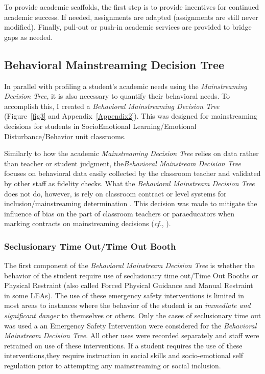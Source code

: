 \documentclass[twoside]{article}
\begin{document}
To provide academic scaffolds, the first step is to provide incentives for continued academic success. If needed, assignments are adapted (assignments are still never modified). Finally, pull-out or push-in academic services are provided to bridge gaps as needed.
%
%
\subsection{Behavioral Mainstreaming Decision Tree}
In parallel with profiling a student's academic needs using the \textit{Mainstreaming Decision Tree}, it is also necessary to quantify their behavioral needs. To accomplish this, I created a \textit{Behavioral Mainstreaming Decision Tree} (Figure~\ref{fig3} and Appendix~\ref{Appendix2}). This was designed for mainstreaming decisions for students in SocioEmotional Learning/Emotional Disturbance/Behavior unit classrooms. 

Similarly to how the academic \textit{Mainstreaming Decision Tree} relies on data rather than teacher or student judgment, the\textit{Behavioral Mainstream Decision Tree} focuses on behavioral data easily collected by the classroom teacher and validated by other staff as fidelity checks. What the \textit{Behavioral Mainstream Decision Tree} does not do, however, is rely on classroom contract or level systems for inclusion/mainstreaming determination \parencite{Smith1993,iwata1974reward}. This decision was made to mitigate the influence of bias on the part of classroom teachers or paraeducators when marking contracts on mainstreaming decisions (\textit{cf.}, \cite{peacock1991problems,PITS:PITS8}). 

\subsubsection{Seclusionary Time Out/Time Out Booth}
The first component of the \textit{Behavioral Mainstream Decision Tree} is whether the behavior of the student require use of seclusionary time out/Time Out Booths or Physical Restraint (also called Forced Physical Guidance and Manual Restraint in some LEAs). The use of these emergency safety interventions is limited in most areas to instances where the behavior of the student is an \textit{immediate and significant danger} to themselves or others. Only the cases of seclusionary time out was used a an Emergency Safety Intervention were considered for the \textit{Behavioral Mainstream Decision Tree}. All other uses were recorded separately and staff were retrained on use of these interventions. If a student requires the use of these interventions,they require instruction in social skills and socio-emotional self regulation prior to attempting any mainstreaming or social inclusion. 
\end{document}
